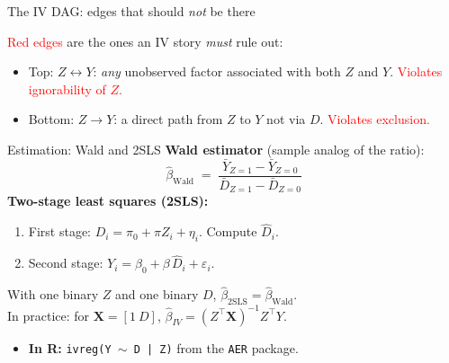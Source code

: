\documentclass[xcolor=dvipsnames]{beamer}
\newcommand{\mb}{\mathbf}
\newcommand{\X}{\ensuremath{\mb{X}}}
\begin{document}
\begin{frame}{The IV DAG: edges that should \textit{not} be there}
\begin{center}
\end{center}
\footnotesize
\textcolor{Red}{Red edges} are the ones an IV story \textit{must} rule out:
\begin{itemize}
\item Top: $Z \leftrightarrow Y$: \textit{any} unobserved factor associated with both $Z$ and $Y$. \textcolor{Red}{Violates ignorability of $Z$.}
\item Bottom: $Z \to Y$: a direct path from $Z$ to $Y$ not via $D$. \textcolor{Red}{Violates exclusion.}
\end{itemize}
\end{frame}

\begin{frame}{Estimation: Wald and 2SLS}
\small
\textbf{Wald estimator} (sample analog of the ratio):
\[
\hat\beta_{\text{Wald}} \;=\; \frac{\bar Y_{Z=1} - \bar Y_{Z=0}}{\bar D_{Z=1} - \bar D_{Z=0}}
\]
\medskip
\textbf{Two-stage least squares (2SLS):}
\begin{enumerate}
\item First stage: $D_i = \pi_0 + \pi Z_i + \eta_i$. Compute $\hat D_i$.
\item Second stage: $Y_i = \beta_0 + \beta\, \hat D_i + \varepsilon_i$.
\end{enumerate}
\bigskip
With one binary $Z$ and one binary $D$, $\hat\beta_{\text{2SLS}} = \hat\beta_{\text{Wald}}$.\\
\bigskip
{} In practice: for $\X=[1\ D]$, $\hat{\beta}_{IV} = (Z^{\top}\X)^{-1} Z^{\top}Y$.\\
\begin{itemize}
\item \textbf{In R:} \texttt{ivreg(Y $\sim$ D | Z)} from the \texttt{AER} package.
\end{itemize}
\end{frame}
\end{document}
